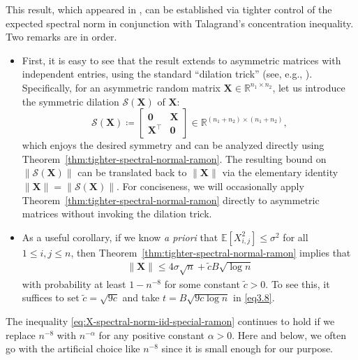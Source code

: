 This result, which appeared in \citet[Remark 3.13]{bandeira2016sharp}, can be established via  tighter control of the expected spectral norm in conjunction with Talagrand's concentration inequality. Two remarks are in order.
%
\begin{itemize}
\item
First, it is easy to see that the result extends to asymmetric matrices with independent entries, using the standard ``dilation trick'' (see, e.g., \citep[Section~2.1.17]{tropp2015introduction}). Specifically, for an asymmetric random matrix $\bm{X}\in\mathbb{R}^{n_1\times n_2}$, let us introduce the symmetric dilation $\mathcal{S}(\bm{X})$ of $\bm{X}$:
\[
\mathcal{S}(\bm{X})\coloneqq\left[\begin{array}{cc}
\bm{0} & \bm{X}\\
\bm{X}^{\top} & \bm{0}
\end{array}\right] \in \mathbb{R}^{ (n_1+n_2) \times (n_1+ n_2)},
\]
which enjoys the desired symmetry and can be analyzed directly using Theorem~\ref{thm:tighter-spectral-normal-ramon}. The resulting bound on $\|\mathcal{S}(\bm{X})\|$ can be translated back to $\|\bm{X}\|$ via the elementary identity $\|\bm{X}\| = \|\mathcal{S}(\bm{X})\|$. For conciseness, we will occasionally apply Theorem~\ref{thm:tighter-spectral-normal-ramon} directly to asymmetric matrices without invoking the dilation trick.

\item As a useful corollary, if we know {\em a priori} that $\mathbb{E}[X_{i,j}^2]\leq \sigma^2$ for all $1\leq i,j\leq n$, then Theorem~\ref{thm:tighter-spectral-normal-ramon} implies that
%
\begin{align}
	\|\bm{X}\| \leq 4\sigma \sqrt{n} + \widetilde{c} B \sqrt{ \log n }
	\label{eq:X-spectral-norm-iid-special-ramon}
\end{align}
%
with probability at least $1-n^{-8}$ for some  constant $\widetilde{c} >0$. To see this, it suffices to set $\widetilde{c} = \sqrt{9c}$ and take $t = B\sqrt{9c \log n} $ in \eqref{eq3.8}.

\end{itemize}




\begin{remark}
	The inequality \eqref{eq:X-spectral-norm-iid-special-ramon} continues to hold if we replace $n^{-8}$ with $n^{-\alpha}$ for any positive constant $\alpha>0$.
	Here and below, we often go with the artificial choice like $n^{-8}$ since it is small enough for our purpose.
\end{remark}
